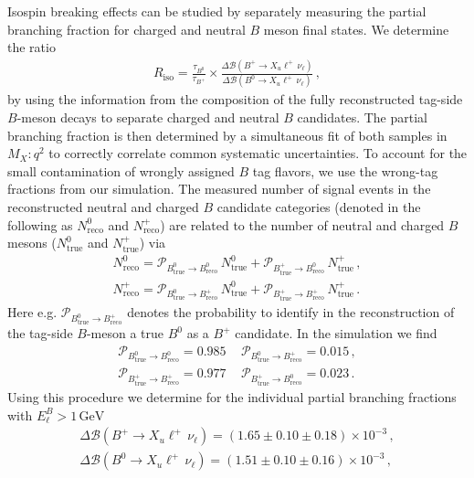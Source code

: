 \documentclass[twocolumn,aps,prd,superscriptaddress,nofootinbib,floatfix,preprintnumbers,a4]{revtex4-1}
\newcommand{\bfResdBp}{\ensuremath{\Delta \mathcal{B}(B^+ \to X_u \ell^+ \, \nu_\ell) = \left( 1.65 \pm 0.10  \pm 0.18 \right) \times 10^{-3}}\xspace}
\newcommand{\bfResdBn}{\ensuremath{\Delta \mathcal{B}(B^0 \to X_u \ell^+ \, \nu_\ell) = \left( 1.51 \pm 0.10  \pm 0.16 \right) \times 10^{-3}}\xspace}
\begin{document}
Isospin breaking effects can be studied by separately measuring the partial branching fraction for charged and neutral $B$ meson final states. We determine the ratio 
\begin{align} \label{eq:isospin_ratio}
 R_{\mathrm{iso}} = \frac{ \tau_{B^0} }{ \tau_{B^+} } \times \frac{ \Delta \mathcal{B}(B^+ \to X_u \ell^+ \, \nu_\ell) }{ \Delta \mathcal{B}(B^0 \to X_u \ell^+ \, \nu_\ell) } \, ,
\end{align}
by using the information from the composition of the fully reconstructed tag-side $B$-meson decays to separate charged and neutral $B$ candidates. The partial branching fraction is then determined by a simultaneous fit of both samples in $M_X:q^2$ to correctly correlate common systematic uncertainties. To account for the small contamination of wrongly assigned $B$ tag flavors, we use the wrong-tag fractions from our simulation. The measured number of signal events in the reconstructed neutral and charged $B$ candidate categories (denoted in the following as $N_{\mathrm{reco}}^0 $ and $ N_{\mathrm{reco}}^+ $) are related to the number of neutral and charged $B$ mesons ($N_{\mathrm{true}}^0 $ and $ N_{\mathrm{true}}^+ $) via
\begin{align}
 N_{\mathrm{reco}}^0 = \mathcal{P}_{B^0_{\mathrm{true}} \to B^0_{\mathrm{reco}} } \, N_{\mathrm{true}}^0 + \mathcal{P}_{B^+_{\mathrm{true}} \to B^0_{\mathrm{reco}} } \, N_{\mathrm{true}}^+ \, , \\
 N_{\mathrm{reco}}^+ = \mathcal{P}_{B^0_{\mathrm{true}} \to B^+_{\mathrm{reco}} } \, N_{\mathrm{true}}^0 + \mathcal{P}_{B^+_{\mathrm{true}} \to B^+_{\mathrm{reco}} } \, N_{\mathrm{true}}^+ \, .
\end{align}
Here e.g. $\mathcal{P}_{B^0_{\mathrm{true}} \to B^+_{\mathrm{reco}} } $ denotes the probability to identify in the reconstruction of the tag-side $B$-meson a true $B^0$ as a $B^+$ candidate. In the simulation we find 
\begin{align}
  \mathcal{P}_{B^0_{\mathrm{true}} \to B^0_{\mathrm{reco}} }  = 0.985 \, \quad   \mathcal{P}_{B^0_{\mathrm{true}} \to B^+_{\mathrm{reco}} }  = 0.015 \, , \\
  \mathcal{P}_{B^+_{\mathrm{true}} \to B^+_{\mathrm{reco}} }  = 0.977 \, \quad   \mathcal{P}_{B^+_{\mathrm{true}} \to B^0_{\mathrm{reco}} }  = 0.023 \, .
\end{align}
Using this procedure we determine for the individual partial branching fractions with $E_\ell^B > 1 \, \text{GeV}$
\begin{align}
\bfResdBp \, , \\
\bfResdBn \, , 
\end{align}
\end{document}
